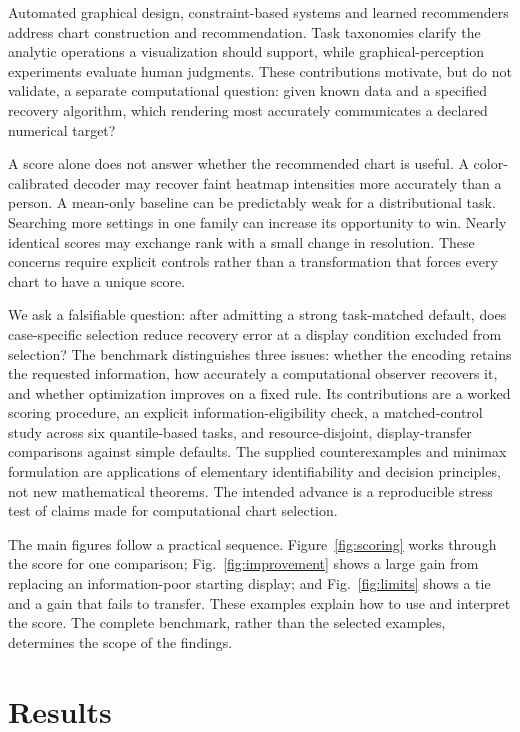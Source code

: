 \documentclass[11pt]{article}
\begin{document}
Automated graphical design, constraint-based systems and learned recommenders address chart construction and recommendation.\cite{mackinlay1986,draco,vizml} Task taxonomies clarify the analytic operations a visualization should support, while graphical-perception experiments evaluate human judgments.\cite{amar2005,cleveland1984} These contributions motivate, but do not validate, a separate computational question: given known data and a specified recovery algorithm, which rendering most accurately communicates a declared numerical target?

A score alone does not answer whether the recommended chart is useful. A color-calibrated decoder may recover faint heatmap intensities more accurately than a person. A mean-only baseline can be predictably weak for a distributional task. Searching more settings in one family can increase its opportunity to win. Nearly identical scores may exchange rank with a small change in resolution. These concerns require explicit controls rather than a transformation that forces every chart to have a unique score.

We ask a falsifiable question: after admitting a strong task-matched default, does case-specific selection reduce recovery error at a display condition excluded from selection? The benchmark distinguishes three issues: whether the encoding retains the requested information, how accurately a computational observer recovers it, and whether optimization improves on a fixed rule. Its contributions are a worked scoring procedure, an explicit information-eligibility check, a matched-control study across six quantile-based tasks, and resource-disjoint, display-transfer comparisons against simple defaults. The supplied counterexamples and minimax formulation are applications of elementary identifiability and decision principles, not new mathematical theorems. The intended advance is a reproducible stress test of claims made for computational chart selection.

The main figures follow a practical sequence. Figure~\ref{fig:scoring} works through the score for one comparison; Fig.~\ref{fig:improvement} shows a large gain from replacing an information-poor starting display; and Fig.~\ref{fig:limits} shows a tie and a gain that fails to transfer. These examples explain how to use and interpret the score. The complete benchmark, rather than the selected examples, determines the scope of the findings.

\section*{Results}
\end{document}
